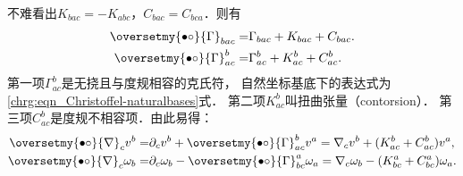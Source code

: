 不难看出$K_{bac} = -K_{abc}$，$C_{bac} = C_{bca}$．则有
\begin{subequations}\label{chrg:eqn_AC-CCT}
	\begin{align}
		\oversetmy{\bullet\circ}{\Gamma}_{bac} =&\Gamma_{bac} + K_{bac} + C_{bac}. \\
		\oversetmy{\bullet\circ}{\Gamma}^b_{ac}=&\Gamma^{b}_{ac}+K^b_{ac}+C^b_{ac}.
	\end{align}
\end{subequations}
第一项$\Gamma^{b}_{ac}$是无挠且与度规相容的克氏符，
自然坐标基底下的表达式为\eqref{chrg:eqn_Christoffel-naturalbases}式．
第二项$K^b_{ac}$叫{\heiti 扭曲张量}（contorsion）．      
第三项$C^b_{ac}$是度规不相容项．由此易得：
\begin{align}
	\oversetmy{\bullet\circ}{\nabla}_c v^b = & \partial_c v^b + \oversetmy{\bullet\circ}{\Gamma}^b_{ac} v^a
	= \nabla_c v^b + (K^b_{ac}+C^b_{ac}) v^a, \\
	\oversetmy{\bullet\circ}{\nabla}_c \omega_b = & \partial_c \omega_b 
	- \oversetmy{\bullet\circ}{\Gamma}^a_{bc} \omega_a
	= \nabla_c \omega_b - (K^a_{bc}+C^a_{bc}) \omega_a .
\end{align}


